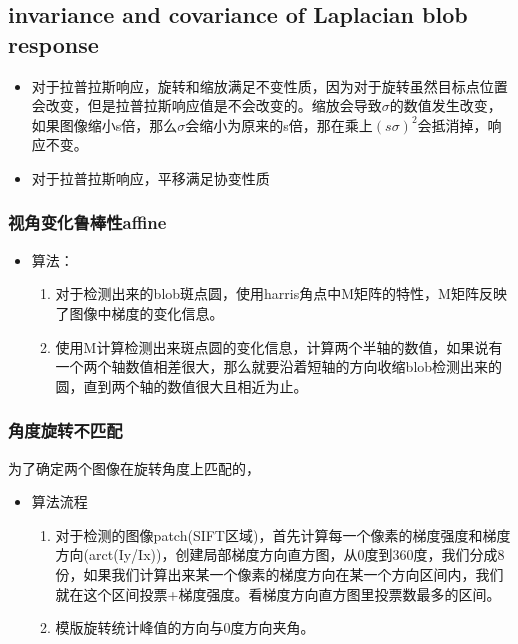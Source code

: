 \documentclass[UTF8]{ctexart}
\begin{document}
\subsection{invariance and covariance of Laplacian blob response}

\begin{itemize}
    \item 对于拉普拉斯响应，旋转和缩放满足不变性质，因为对于旋转虽然目标点位置会改变，但是拉普拉斯响应值是不会改变的。缩放会导致$\sigma$的数值发生改变，如果图像缩小s倍，那么$\sigma$会缩小为原来的s倍，那在乘上$(s\sigma)^2$会抵消掉，响应不变。
    \item 对于拉普拉斯响应，平移满足协变性质
\end{itemize}

\subsubsection{视角变化鲁棒性affine}

\begin{itemize}
    \item 算法：
    \begin{enumerate}
        \item 对于检测出来的blob斑点圆，使用harris角点中M矩阵的特性，M矩阵反映了图像中梯度的变化信息。
        \item 使用M计算检测出来斑点圆的变化信息，计算两个半轴的数值，如果说有一个两个轴数值相差很大，那么就要沿着短轴的方向收缩blob检测出来的圆，直到两个轴的数值很大且相近为止。
    \end{enumerate}
\end{itemize}

\subsubsection{角度旋转不匹配}
为了确定两个图像在旋转角度上匹配的，

\begin{itemize}
    \item 算法流程
    \begin{enumerate}
        \item 对于检测的图像patch(SIFT区域)，首先计算每一个像素的梯度强度和梯度方向(arct(Iy/Ix))，创建局部梯度方向直方图，从0度到360度，我们分成8份，如果我们计算出来某一个像素的梯度方向在某一个方向区间内，我们就在这个区间投票+梯度强度。看梯度方向直方图里投票数最多的区间。
        \item 模版旋转统计峰值的方向与0度方向夹角。
    \end{enumerate}
\end{itemize}
\end{document}
